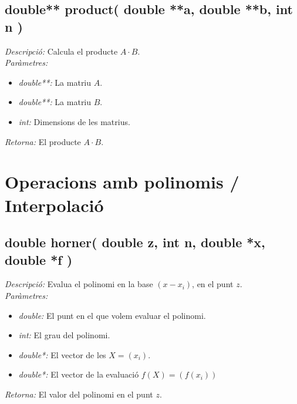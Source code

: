 \documentclass[a4paper,10pt, notitlepage]{article}
\begin{document}
\subsection{double** product( double **a, double **b, int n )}
\textit{Descripció: }
  Calcula el producte $A\cdot B$.
\\\textit{Paràmetres: }\begin{itemize}[label={--}]
  \item \textit{double**: } La matriu $A$.
  \item \textit{double**: } La matriu $B$.
  \item \textit{int: } Dimensions de les matrius.
\end{itemize}
\textit{Retorna: } El producte $A\cdot B$.




\section{Operacions amb polinomis / Interpolació}



\subsection{double horner( double z, int n, double *x, double *f )}
\textit{Descripció: }
  Evalua el polinomi en la base $(x-x_i)$, en el punt $z$.
\\\textit{Paràmetres: }\begin{itemize}[label={--}]
  \item \textit{double: } El punt en el que volem evaluar el polinomi.
  \item \textit{int: } El grau del polinomi.
  \item \textit{double*: } El vector de les $X = (x_i)$.
  \item \textit{double*: } El vector de la evaluació $f(X) = ( f(x_i) )$
\end{itemize}
\textit{Retorna: } El valor del polinomi en el punt $z$.
\end{document}
